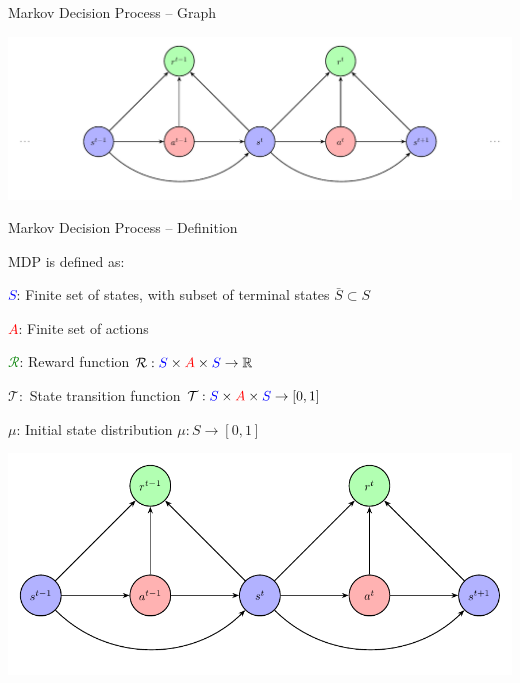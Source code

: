 \begin{frame}{Markov Decision Process -- Graph}
    
      \centering
      \includegraphics[width=1\textwidth]{images/1_mdp_diagram_elipses.pdf}
    
\end{frame}

\begin{frame}{Markov Decision Process --  Definition}
	\vspace{10pt}
	
  \bcol

     MDP is defined as: \\[5pt]
     
      \blist
      	\itemsep=10pt
        \item \textcolor{blue}{$S$}: Finite set of states, with subset of terminal states $\bar{S} \subset S$
        \item \textcolor{red}{$A$}: Finite set of actions
        \item \textcolor{green}{$\mathcal{R}$}: Reward function $\mathcal{R}: \textcolor{blue}{S} \times \textcolor{red}{A} \times \textcolor{blue}{S} \to \mathbb{R}$
        \item $\mathcal{T}:$ State transition function $\mathcal{T}: \textcolor{blue}{S} \times \textcolor{red}{A} \times \textcolor{blue}{S} \to [0, 1]$
        \item $\mu$: Initial state distribution $\mu: S \to [0,1]$
      \elist

        \includegraphics[width=\linewidth]{images/1_mdp_diagram.pdf}

  \ecol
\end{frame}


